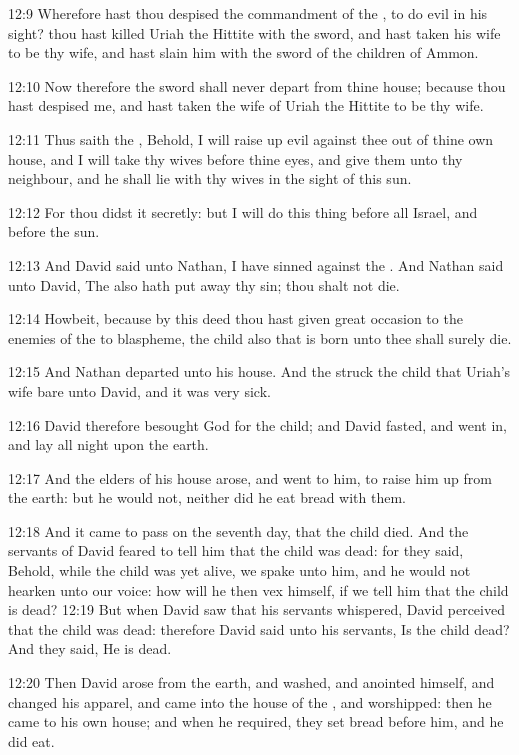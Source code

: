 12:9 Wherefore hast thou despised the commandment of the \LORD, to do evil in his sight? thou hast killed Uriah the Hittite with the sword, and hast taken his wife to be thy wife, and hast slain him with the sword of the children of Ammon.

12:10 Now therefore the sword shall never depart from thine house; because thou hast despised me, and hast taken the wife of Uriah the Hittite to be thy wife.

12:11 Thus saith the \LORD, Behold, I will raise up evil against thee out of thine own house, and I will take thy wives before thine eyes, and give them unto thy neighbour, and he shall lie with thy wives in the sight of this sun.

12:12 For thou didst it secretly: but I will do this thing before all Israel, and before the sun.

12:13 And David said unto Nathan, I have sinned against the \LORD. And Nathan said unto David, The \LORD also hath put away thy sin; thou shalt not die.

12:14 Howbeit, because by this deed thou hast given great occasion to the enemies of the \LORD to blaspheme, the child also that is born unto thee shall surely die.

12:15 And Nathan departed unto his house. And the \LORD struck the child that Uriah's wife bare unto David, and it was very sick.

12:16 David therefore besought God for the child; and David fasted, and went in, and lay all night upon the earth.

12:17 And the elders of his house arose, and went to him, to raise him up from the earth: but he would not, neither did he eat bread with them.

12:18 And it came to pass on the seventh day, that the child died. And the servants of David feared to tell him that the child was dead: for they said, Behold, while the child was yet alive, we spake unto him, and he would not hearken unto our voice: how will he then vex himself, if we tell him that the child is dead?  12:19 But when David saw that his servants whispered, David perceived that the child was dead: therefore David said unto his servants, Is the child dead? And they said, He is dead.

12:20 Then David arose from the earth, and washed, and anointed himself, and changed his apparel, and came into the house of the \LORD, and worshipped: then he came to his own house; and when he required, they set bread before him, and he did eat.


